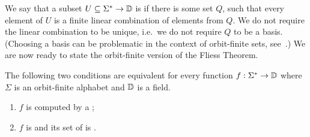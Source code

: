 \AP
We say that a subset  $U \subseteq \Sigma^* \to \mathbb D$  is
 if there is some  set $Q$, such that
every element of $U$ is a finite linear combination of elements from $Q$. We do
not require the linear combination to be unique, i.e.~we do not require $Q$ to
be a basis. (Choosing a basis can be problematic in the context of orbit-finite
sets, see~\cite[Example 77]{bojanczyk_slightly}.) We are now ready to state the
orbit-finite version of the Fliess Theorem.

\begin{theorem}\label{thm:orbit-finite-fliess}
    The following two conditions are equivalent for every function
    $f : \Sigma^* \to \mathbb D$
    where $\Sigma$ is an orbit-finite alphabet and $\mathbb D$ is a field.
    \begin{enumerate}
      \item \label{it:fliess-weighted} $f$ is computed by a ;
      \item \label{it:fliess-derivatives} $f$ is  and its set of
         is .
    \end{enumerate}
\end{theorem}
